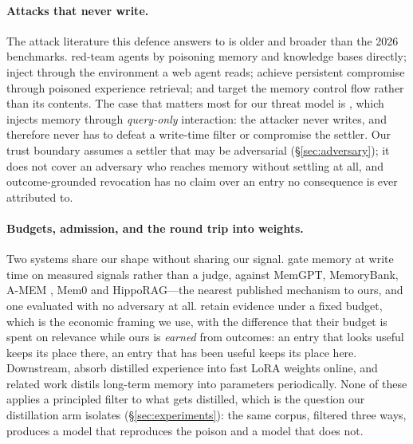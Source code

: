\paragraph{Attacks that never write.}
The attack literature this defence answers to is older and broader than
the 2026 benchmarks. \citet{chen2024agentpoison} red-team agents by
poisoning memory and knowledge bases directly; \citet{zou2026poisononce}
inject through the environment a web agent reads;
\citet{srivastava2025memorygraft} achieve persistent compromise through
poisoned experience retrieval; and \citet{xu2026steering} target the
memory control flow rather than its contents. The case that matters most
for our threat model is \citet{dong2025minja}, which injects memory
through \emph{query-only} interaction: the attacker never writes, and
therefore never has to defeat a write-time filter or compromise the
settler. Our trust boundary assumes a settler that may be adversarial
(\S\ref{sec:adversary}); it does not cover an adversary who reaches memory
without settling at all, and outcome-grounded revocation has no claim
over an entry no consequence is ever attributed to.

\paragraph{Budgets, admission, and the round trip into weights.}
Two systems share our shape without sharing our signal.
\citet{admission2026} gate memory at write time on measured signals
rather than a judge, against MemGPT, MemoryBank, A-MEM
\citep{xu2025amem}, Mem0 \citep{mem0} and HippoRAG---the nearest
published mechanism to ours, and one evaluated with no adversary at all.
\citet{ember2026} retain evidence under a fixed budget, which is the
economic framing we use, with the difference that their budget is spent
on relevance while ours is \emph{earned} from outcomes: an entry that
looks useful keeps its place there, an entry that has been useful keeps
its place here. Downstream, \citet{tmem2026} absorb distilled experience
into fast LoRA weights online, and related work distils long-term memory
into parameters periodically. None of these applies a principled filter
to what gets distilled, which is the question our distillation arm
isolates (\S\ref{sec:experiments}): the same corpus, filtered three ways,
produces a model that reproduces the poison and a model that does not.

